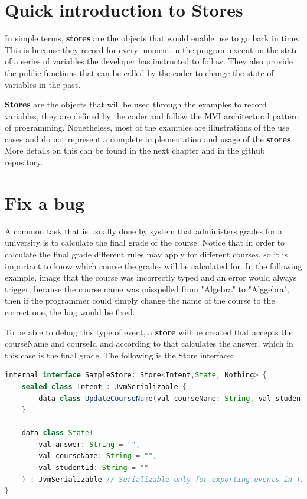 \section{Quick introduction to Stores}

In simple terms, \textbf{stores} are the objects that would enable use to go back in time. This is because they record for every moment in the program execution the state of a series of variables the developer has instructed to follow. They also provide the public functions that can be called by the coder to change the state of variables in the past.

\textbf{Stores} are the objects that will be used through the examples to record variables, they are defined by the coder and follow the MVI architectural pattern of programming. Nonetheless, most of the examples are illustrations of the use cases and do not represent a complete implementation and usage of the \textbf{stores}. More details on this can be found in the next chapter and in the github repository.

\section{Fix a bug}

A common task that is usually done by system that administers grades for a university is to calculate the final grade of the course. Notice that in order to calculate the final grade different rules may apply for different courses, so it is important to know which course the grades will be calculated for. In the following example, image that the course was incorrectly typed and an error would always trigger, because the course name was misspelled from "Algebra" to "Alggebra", then if the programmer could simply change the name of the course to the correct one, the bug would be fixed.

To be able to debug this type of event, a \textbf{store} will be created that accepts the courseName and courseId and according to that calculates the answer, which in this case is the final grade. The following is the Store interface:


\begin{lstlisting}[language=java]
internal interface SampleStore: Store<Intent,State, Nothing> {
    sealed class Intent : JvmSerializable {
        data class UpdateCourseName(val courseName: String, val studentId: String) : Intent()
    }

    data class State(
        val answer: String = "",
        val courseName: String = "",
        val studentId: String = ""
    ) : JvmSerializable // Serializable only for exporting events in Time Travel, no need otherwise.
}
\end{lstlisting}

